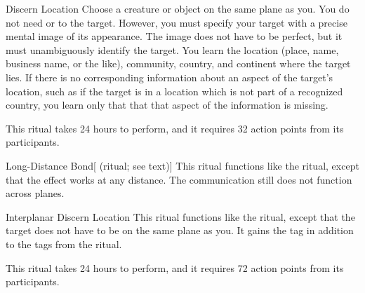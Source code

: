 \lowercase{\hypertarget{spell:Discern Location}{}}\label{spell:Discern Location}
\begin{apability}[\nth{4}]{\hypertarget{spell:Discern Location}{Discern Location}}
Choose a creature or object on the same plane as you.
You do not need  or  to the target.
However, you must specify your target with a precise mental image of its appearance.
The image does not have to be perfect, but it must unambiguously identify the target.
You learn the location (place, name, business name, or the like), community, country, and continent where the target lies.
If there is no corresponding information about an aspect of the target's location, such as if the target is in a location which is not part of a recognized country,
you learn only that that that aspect of the information is missing.

This ritual takes 24 hours to perform, and it requires 32 action points from its participants.
\end{apability}
\vspace{0.25em}



\lowercase{\hypertarget{spell:Long-Distance Bond}{}}\label{spell:Long-Distance Bond}
\begin{attuneability}[\nth{5}]{\hypertarget{spell:Long-Distance Bond}{Long-Distance Bond}}[ (ritual; see text)]
This ritual functions like the  ritual, except that the effect works at any distance.
The communication still does not function across planes.
\end{attuneability}
\vspace{0.25em}



\lowercase{\hypertarget{spell:Interplanar Discern Location}{}}\label{spell:Interplanar Discern Location}
\begin{apability}[\nth{6}]{\hypertarget{spell:Interplanar Discern Location}{Interplanar Discern Location}}
This ritual functions like the  ritual, except that the target does not have to be on the same plane as you.
It gains the  tag in addition to the tags from the  ritual.

This ritual takes 24 hours to perform, and it requires 72 action points from its participants.
\end{apability}
\vspace{0.25em}



